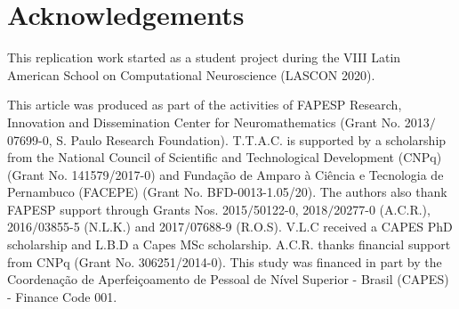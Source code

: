 \section*{Acknowledgements}

This replication work started as a student project during the VIII Latin American School on Computational Neuroscience (LASCON 2020).

This article was produced as part of the activities of FAPESP  Research, Innovation and Dissemination Center for Neuromathematics (Grant No. 2013$/$07699-0, S. Paulo Research Foundation). T.T.A.C. is supported by a scholarship from the National Council of Scientific and Technological Development (CNPq) (Grant No. 141579/2017-0) and Fundação de Amparo à Ciência e Tecnologia de Pernambuco (FACEPE) (Grant No. BFD-0013-1.05/20).
The authors also thank FAPESP support through Grants Nos. 2015$/$50122-0, 2018$/$20277-0  (A.C.R.), 2016$/$03855-5 (N.L.K.) and 2017$/$07688-9 (R.O.S). V.L.C received a CAPES PhD scholarship and L.B.D a Capes MSc scholarship.
A.C.R. thanks financial support from CNPq (Grant No. 306251/2014-0).
This study was financed in part by the Coordenação de Aperfeiçoamento de Pessoal de Nível Superior - Brasil (CAPES) - Finance Code 001.


